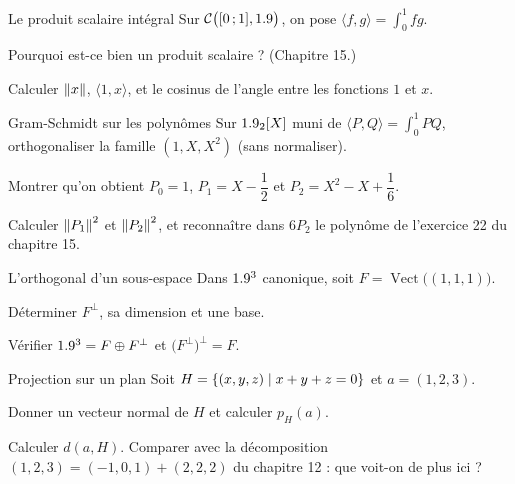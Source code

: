\begin{exercice}[2]{Le produit scalaire intégral}
Sur $\mathcal{C}\bigl(\mathopen{[}0\,{;}\,1\mathclose{]},1.9\bigr)$, on pose
$\langle f,g\rangle=\displaystyle\int_{0}^{1}fg$.
\begin{questions}
  \item Pourquoi est-ce bien un produit scalaire ? (Chapitre 15.)
  \item Calculer $\left\lVert x\right\rVert$, $\langle 1,x\rangle$, et le cosinus de
    l'angle entre les fonctions $1$ et $x$.
\end{questions}
\end{exercice}

\begin{exercice}[2]{Gram-Schmidt sur les polynômes}
Sur $1.9_2[X]$ muni de
$\langle P,Q\rangle=\displaystyle\int_{0}^{1}PQ$, orthogonaliser la
famille $(1,X,X^{2})$ (sans normaliser).
\begin{questions}
  \item Montrer qu'on obtient $P_0=1$, $P_1=X-\dfrac12$ et
    $P_2=X^{2}-X+\dfrac16$.
  \item Calculer $\left\lVert P_1\right\rVert^{2}$ et $\left\lVert P_2\right\rVert^{2}$, et reconnaître
    dans $6P_2$ le polynôme de l'exercice 22 du chapitre 15.
\end{questions}
\end{exercice}

\begin{exercice}[2]{L'orthogonal d'un sous-espace}
Dans $1.9^{3}$ canonique, soit $F=\operatorname{Vect}\bigl((1,1,1)\bigr)$.
\begin{questions}
  \item Déterminer $F^{\perp}$, sa dimension et une base.
  \item Vérifier $1.9^{3}=F\oplus F^{\perp}$ et
    $\bigl(F^{\perp}\bigr)^{\perp}=F$.
\end{questions}
\end{exercice}

\begin{exercice}[2]{Projection sur un plan}
Soit $H=\left\{(x,y,z)\mid x+y+z=0\right\}$ et $a=(1,2,3)$.
\begin{questions}
  \item Donner un vecteur normal de $H$ et calculer $p_H(a)$.
  \item Calculer $d(a,H)$. Comparer avec la décomposition
    $(1,2,3)=(-1,0,1)+(2,2,2)$ du chapitre 12 : que voit-on de plus ici ?
\end{questions}
\end{exercice}

